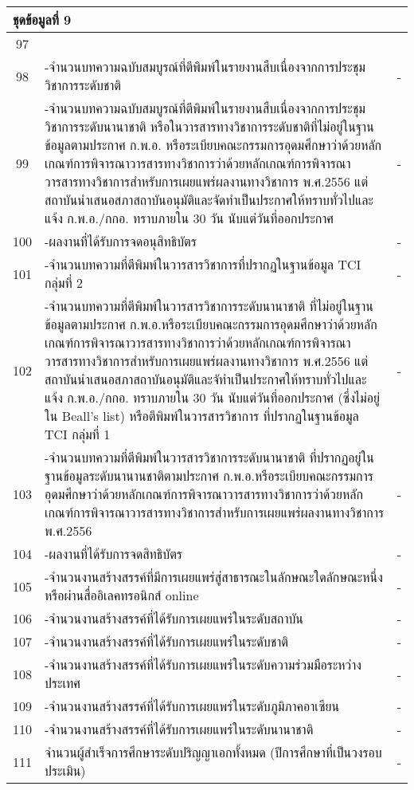 \begin{longtable}{|c|p{}|c|}
	\multicolumn{3}{|l|}{\textbf{ชุดข้อมูลที่ 9}}\\\hline
	97&\cellcolor{red!10}{จำนวนรวมของผลงานนักศึกษาและผู้สำเร็จการศึกษาในระดับปริญญาเอกที่ได้รับการตีพิมพ์หรือเผยแพร่}&\cellcolor{red!10}{\textbf{-}}\\\hline
	98&-จำนวนบทความฉบับสมบูรณ์ที่ตีพิมพ์ในรายงานสืบเนื่องจากการประชุมวิชาการระดับชาติ&-\\\hline
	99&-จำนวนบทความฉบับสมบูรณ์ที่ตีพิมพ์ในรายงานสืบเนื่องจากการประชุมวิชาการระดับนานาชาติ หรือในวารสารทางวิชาการระดับชาติที่ไม่อยู่ในฐานข้อมูลตามประกาศ ก.พ.อ. หรือระเบียบคณะกรรมการอุดมศึกษาว่าด้วยหลักเกณฑ์การพิจารณาวารสารทางวิชาการว่าด้วยหลักเกณฑ์การพิจารณาวารสารทางวิชาการสำหรับการเผยแพร่ผลงานทางวิชาการ พ.ศ.2556 แต่สถาบันนำเสนอสภาสถาบันอนุมัติและจัดทำเป็นประกาศให้ทราบทั่วไปและแจ้ง ก.พ.อ./กกอ. ทราบภายใน 30 วัน  นับแต่วันที่ออกประกาศ&-\\\hline
	100&-ผลงานที่ได้รับการจดอนุสิทธิบัตร&-\\\hline
	101&-จำนวนบทความที่ตีพิมพ์ในวารสารวิชาการที่ปรากฏในฐานข้อมูล TCI กลุ่มที่ 2&-\\\hline
	102&-จำนวนบทความที่ตีพิมพ์ในวารสารวิชาการระดับนานาชาติ ที่ไม่อยู่ในฐานข้อมูลตามประกาศ ก.พ.อ.หรือระเบียบคณะกรรมการอุดมศึกษาว่าด้วยหลักเกณฑ์การพิจารณาวารสารทางวิชาการว่าด้วยหลักเกณฑ์การพิจารณาวารสารทางวิชาการสำหรับการเผยแพร่ผลงานทางวิชาการ พ.ศ.2556 แต่สถาบันนำเสนอสภาสถาบันอนุมัติและจัทำเป็นประกาศให้ทราบทั่วไปและแจ้ง ก.พ.อ./กกอ. ทราบภายใน 30 วัน  นับแต่วันที่ออกประกาศ (ซึ่งไม่อยู่ใน Beall's list) หรือตีพิมพ์ในวารสารวิชาการ ที่ปรากฏในฐานข้อมูล TCI กลุ่มที่ 1&-\\\hline
	103&-จำนวนบทความที่ตีพิมพ์ในวารสารวิชาการระดับนานาชาติ ที่ปรากฏอยู่ในฐานข้อมูลระดับนานานชาติตามประกาศ ก.พ.อ.หรือระเบียบคณะกรรมการอุดมศึกษาว่าด้วยหลักเกณฑ์การพิจารณาวารสารทางวิชาการว่าด้วยหลักเกณฑ์การพิจารณาวารสารทางวิชาการสำหรับการเผยแพร่ผลงานทางวิชาการ พ.ศ.2556&-\\\hline
	104&-ผลงานที่ได้รับการจดสิทธิบัตร&-\\\hline
	105&-จำนวนงานสร้างสรรค์ที่มีการเผยแพร่สู่สาธารณะในลักษณะใดลักษณะหนึ่ง หรือผ่านสื่ออิเลคทรอนิกส์ online&-\\\hline
	106&-จำนวนงานสร้างสรรค์ที่ได้รับการเผยแพร่ในระดับสถาบัน&-\\\hline
	107&-จำนวนงานสร้างสรรค์ที่ได้รับการเผยแพร่ในระดับชาติ&-\\\hline
	108&-จำนวนงานสร้างสรรค์ที่ได้รับการเผยแพร่ในระดับความร่วมมือระหว่างประเทศ&-\\\hline
	109&-จำนวนงานสร้างสรรค์ที่ได้รับการเผยแพร่ในระดับภูมิภาคอาเซียน&-\\\hline
	110&-จำนวนงานสร้างสรรค์ที่ได้รับการเผยแพร่ในระดับนานาชาติ &-\\\hline
	111&จำนวนผู้สำเร็จการศึกษาระดับปริญญาเอกทั้งหมด (ปีการศึกษาที่เป็นวงรอบประเมิน)&-\\\hline
	

\end{longtable}
